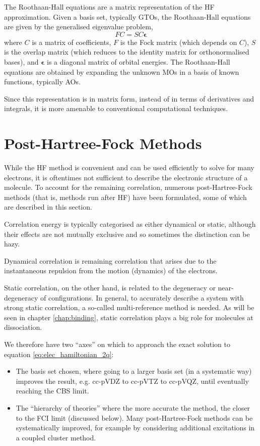 The Roothaan-Hall equations are a matrix representation of the \gls{HF} approximation.\cite{roothaanNew1951,hallMolecular1997} Given a basis set, typically \glspl{GTO}, the Roothaan-Hall equations are given by the generalised eigenvalue problem,
\begin{equation}
    FC = SC\bm\epsilon
\end{equation}
where $C$ is a matrix of coefficients, $F$ is the Fock matrix (which depends on $C$), $S$ is the overlap matrix (which reduces to the identity matrix for orthonormalised bases), and $\bm\epsilon$ is a diagonal matrix of orbital energies. The Roothaan-Hall equations are obtained by expanding the unknown \glspl{MO} in a basis of known functions, typically \glspl{AO}.

Since this representation is in matrix form, instead of in terms of derivatives and integrals, it is more amenable to conventional computational techniques.

\section{Post-Hartree-Fock Methods}
\label{sec:post-hf}

While the \gls{HF} method is convenient and can be used efficiently to solve for many electrons, it is oftentimes not sufficient to describe the electronic structure of a molecule. To account for the remaining correlation, numerous post-Hartree-Fock methods (that is, methods run after \gls{HF}) have been formulated, some of which are described in this section.

Correlation energy is typically categorised as either dynamical or static, although their effects are not mutually exclusive and so sometimes the distinction can be hazy.

Dynamical correlation is remaining correlation that arises due to the instantaneous repulsion from the motion (dynamics) of the electrons.

Static correlation, on the other hand, is related to the degeneracy or near-degeneracy of configurations. In general, to accurately describe a system with strong static correlation, a so-called multi-reference method is needed. As will be seen in chapter \ref{chap:binding}, static correlation plays a big role for molecules at dissociation.

We therefore have two ``axes'' on which to approach the exact solution to equation \ref{eq:elec_hamiltonian_2q}:
\begin{itemize}
    \item The basis set chosen, where going to a larger basis set (in a systematic way) improves the result, e.g. cc-pVDZ to cc-pVTZ to cc-pVQZ, until eventually reaching the \gls{CBS} limit.
    \item The ``hierarchy of theories'' where the more accurate the method, the closer to the \gls{FCI} limit (discussed below). Many post-Hartree-Fock methods can be systematically improved, for example by considering additional excitations in a coupled cluster method.
\end{itemize}

